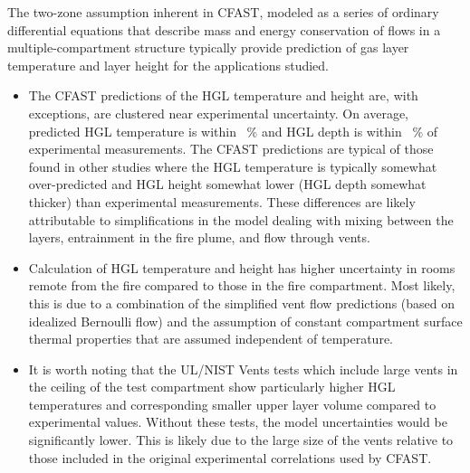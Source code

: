 The two-zone assumption inherent in CFAST, modeled as a series of ordinary differential equations that describe mass and energy conservation of flows in a multiple-compartment structure typically provide prediction of gas layer temperature and layer height for the applications studied. 

\begin{itemize}
\item The CFAST predictions of the HGL temperature and height are, with exceptions, are clustered near experimental uncertainty. On average, predicted HGL temperature is within \HGLtempavg~\% and HGL depth is within \HGLhgtavg~\% of experimental measurements. The CFAST predictions are typical of those found in other studies where the HGL temperature is typically somewhat over-predicted and HGL height somewhat lower (HGL depth somewhat thicker) than experimental measurements. These differences are likely attributable to simplifications in the model dealing with mixing between the layers, entrainment in the fire plume, and flow through vents. 
\item Calculation of HGL temperature and height has higher uncertainty in rooms remote from the fire compared to those in the fire compartment.  Most likely, this is due to a combination of the simplified vent flow predictions (based on idealized Bernoulli flow) and the assumption of constant compartment surface thermal properties that are assumed independent of temperature.
\item It is worth noting that the UL/NIST Vents tests which include large vents in the ceiling of the test compartment show particularly higher HGL temperatures and corresponding smaller upper layer volume compared to experimental values.  Without these tests, the model uncertainties would be significantly lower.  This is likely due to the large size of the vents relative to those included in the original experimental correlations used by CFAST.
\end{itemize}




